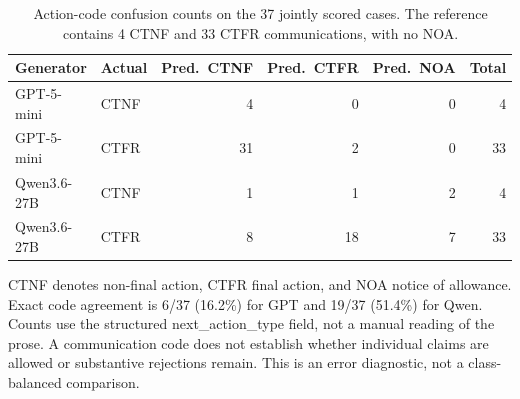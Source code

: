 \begin{table}[t]
\centering
\small
\setlength{\tabcolsep}{6pt}
\renewcommand{\arraystretch}{1.14}
\begin{tabular}{llrrrr}
\toprule
Generator & Actual & Pred.\ CTNF & Pred.\ CTFR & Pred.\ NOA & Total \\
\midrule
GPT-5-mini & CTNF & 4 & 0 & 0 & 4 \\
GPT-5-mini & CTFR & 31 & 2 & 0 & 33 \\
\midrule
Qwen3.6-27B & CTNF & 1 & 1 & 2 & 4 \\
Qwen3.6-27B & CTFR & 8 & 18 & 7 & 33 \\
\bottomrule
\end{tabular}
\caption{Action-code confusion counts on the 37 jointly scored cases. The reference contains 4 CTNF and 33 CTFR communications, with no NOA.}
\label{tab:cgen-t04}
\vspace{2pt}
\begin{minipage}{\textwidth}
\footnotesize CTNF denotes non-final action, CTFR final action, and NOA notice of allowance. Exact code agreement is 6/37 (16.2\%) for GPT and 19/37 (51.4\%) for Qwen. Counts use the structured next\_action\_type field, not a manual reading of the prose. A communication code does not establish whether individual claims are allowed or substantive rejections remain. This is an error diagnostic, not a class-balanced comparison.
\end{minipage}
\end{table}
